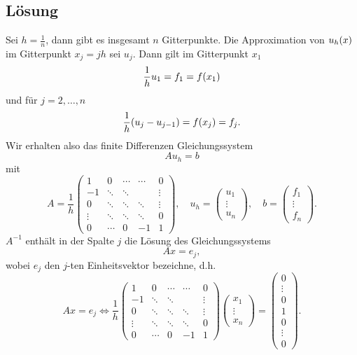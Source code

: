 \documentclass{exercise}
\begin{document}
    \subsection*{Lösung}
    Sei \(h = \frac{1}{n}\), dann gibt es insgesamt \(n\) Gitterpunkte.
    Die Approximation von \(u_h\parentheses*{x}\) im Gitterpunkt \(x_j = jh\) sei \(u_j\).
    Dann gilt im Gitterpunkt \(x_1\)
    \[
        \frac{1}{h}u_1 = f_1 = f\parentheses*{x_1}
    \]
    und für \(j = 2, \ldots, n\)
    \[
        \frac{1}{h}\parentheses*{u_j - u_{j - 1}} = f\parentheses*{x_j} = f_j.
    \]
    Wir erhalten also das finite Differenzen Gleichungssystem
    \[
        Au_h = b
    \]
    mit
    \[
        A = \frac{1}{h}\begin{pmatrix}
            1 & 0 & \cdots & \cdots & 0\\
            -1 & \ddots & \ddots & & \vdots\\
            0 & \ddots & \ddots & \ddots & \vdots\\
            \vdots & \ddots & \ddots & \ddots & 0\\
            0 & \cdots & 0 & -1 & 1
        \end{pmatrix}, \quad u_h = \begin{pmatrix}
            u_1\\
            \vdots\\
            u_n
        \end{pmatrix}, \quad b = \begin{pmatrix}
            f_1\\
            \vdots\\
            f_n
        \end{pmatrix}.
    \]
    \(A^{-1}\) enthält in der Spalte \(j\) die Lösung des Gleichungssystems
    \[
        Ax = e_j,
    \]
    wobei \(e_j\) den \(j\)-ten Einheitsvektor bezeichne, d.h.
    \[
        Ax = e_j \iff \frac{1}{h}\begin{pmatrix}
            1 & 0 & \cdots & \cdots & 0\\
            -1 & \ddots & \ddots & & \vdots\\
            0 & \ddots & \ddots & \ddots & \vdots\\
            \vdots & \ddots & \ddots & \ddots & 0\\
            0 & \cdots & 0 & -1 & 1
        \end{pmatrix}\begin{pmatrix}
            x_1\\
            \vdots\\
            x_n
        \end{pmatrix} = \begin{pmatrix}
            0\\
            \vdots\\
            0\\
            1\\
            0\\
            \vdots\\
            0
        \end{pmatrix}.
    \]
\end{document}
